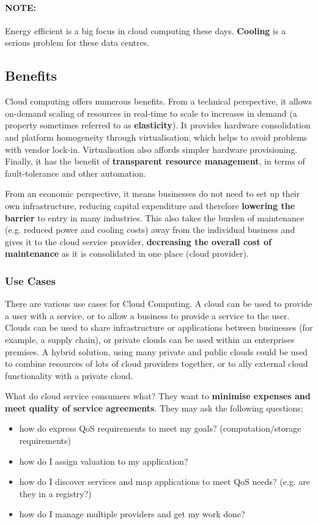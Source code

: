 \documentclass{article}
\begin{document}
\paragraph{\textbf{NOTE: }} Energy efficient is a big focus in cloud computing these days. \textbf{Cooling} is a serious problem for these data centres.

\subsection{Benefits}

Cloud computing offers numerous benefits. From a technical perspective, it allows on-demand scaling of resources in real-time to scale to increases in demand (a property sometimes referred to as \textbf{elasticity}). It provides hardware consolidation and platform homogeneity through virtualisation, which helps to avoid problems with vendor lock-in. Virtualisation also affords simpler hardware provisioning. Finally, it has the benefit of \textbf{transparent resource management}, in terms of fault-tolerance and other automation.

From an economic perspective, it means businesses do not need to set up their own infrastructure, reducing capital expenditure and therefore \textbf{lowering the barrier} to entry in many industries. This also takes the burden of maintenance (e.g. reduced power and cooling costs) away from the individual business and gives it to the cloud service provider, \textbf{decreasing the overall cost of maintenance} as it is consolidated in one place (cloud provider).

\subsubsection{Use Cases}

There are various use cases for Cloud Computing. A cloud can be used to provide a user with a service, or to allow a business to provide a service to the user. Clouds can be used to share infrastructure or applications between businesses (for example, a supply chain), or private clouds can be used within an enterprises premises. A hybrid solution, using many private and public clouds could be used to combine resources of lots of cloud providers together, or to ally external cloud functionality with a private cloud.

What do cloud service consumers what? They want to \textbf{minimise expenses and meet quality of service agreements}. They may ask the following questions;
\begin{itemize}
	\item how do express QoS requirements to meet my goals? (computation/storage requirements)
	\item how do I assign valuation to my application?
	\item how do I discover services and map applications to meet QoS needs? (e.g. are they in a registry?)
	\item how do I manage multiple providers and get my work done?
\end{itemize}
\end{document}
